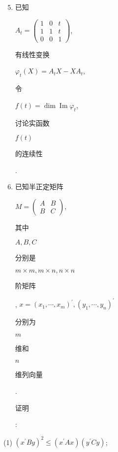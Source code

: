 \documentclass[10pt]{article}
\begin{document}
\begin{enumerate}
  \setcounter{enumi}{4}
  \item \begin{CJK}{UTF8}{mj}已知\end{CJK} $A_{t}=\left(\begin{array}{ccc}1 & 0 & t \\ 1 & 1 & t \\ 0 & 0 & 1\end{array}\right)$, \begin{CJK}{UTF8}{mj}有线性变换\end{CJK} $\varphi_{t}(X)=A_{t} X-X A_{t}$, \begin{CJK}{UTF8}{mj}令\end{CJK} $f(t)=\operatorname{dim} \operatorname{Im} \varphi_{t}$, \begin{CJK}{UTF8}{mj}讨论实函数\end{CJK} $f(t)$ \begin{CJK}{UTF8}{mj}的连续性\end{CJK}.

  \item \begin{CJK}{UTF8}{mj}已知半正定矩阵\end{CJK} $M=\left(\begin{array}{cc}A & B \\ B & C\end{array}\right)$, \begin{CJK}{UTF8}{mj}其中\end{CJK} $A, B, C$ \begin{CJK}{UTF8}{mj}分别是\end{CJK} $m \times m, m \times n, n \times n$ \begin{CJK}{UTF8}{mj}阶矩阵\end{CJK}, $x=\left(x_{1}, \cdots, x_{m}\right)^{\prime},\left(y_{1}, \cdots, y_{n}\right)^{\prime}$ \begin{CJK}{UTF8}{mj}分别为\end{CJK} $m$ \begin{CJK}{UTF8}{mj}维和\end{CJK} $n$ \begin{CJK}{UTF8}{mj}维列向量\end{CJK}. \begin{CJK}{UTF8}{mj}证明\end{CJK}:

\end{enumerate}
(1) $\left(x^{\prime} B y\right)^{2} \leq\left(x^{\prime} A x\right)\left(y^{\prime} C y\right)$;
\end{document}
